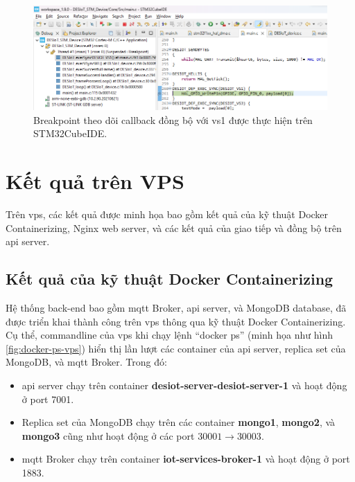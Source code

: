 \begin{figure}[htp]
\centering
\captionsetup{justification=centering}
\includegraphics[width=1.0\linewidth, frame]{images/fig-VS1-callback-trig.png}
\caption{Breakpoint theo dõi callback đồng bộ với \acrshort{vs}1 được thực hiện trên STM32CubeIDE.}
\label{fig:VS1-callback-trig}
\end{figure}

\section{Kết quả trên VPS}

Trên \acrshort{vps}, các kết quả được minh họa bao gồm kết quả của kỹ thuật Docker Containerizing, Nginx web server, và các kết quả của giao tiếp và đồng bộ trên \acrshort{api} server.

\subsection{Kết quả của kỹ thuật Docker Containerizing}

Hệ thống back-end bao gồm \acrshort{mqtt} Broker, \acrshort{api} server, và MongoDB database, đã được triển khai thành công trên \acrshort{vps} thông qua kỹ thuật Docker Containerizing. Cụ thể, commandline của \acrshort{vps} khi chạy lệnh ``docker ps'' (minh họa như hình \ref{fig:docker-ps-vps}) hiển thị lần lượt các container của \acrshort{api} server, replica set của MongoDB, và \acrshort{mqtt} Broker. Trong đó:

\begin{itemize}
    \item \acrshort{api} server chạy trên container \textbf{desiot-server-desiot-server-1} và hoạt động ở port 7001.
    \item Replica set của MongoDB chạy trên các container \textbf{mongo1}, \textbf{mongo2}, và \textbf{mongo3} cũng như hoạt động ở các port $30001\rightarrow 30003$.
    \item \acrshort{mqtt} Broker chạy trên container \textbf{iot-services-broker-1} và hoạt động ở port 1883.
\end{itemize}

